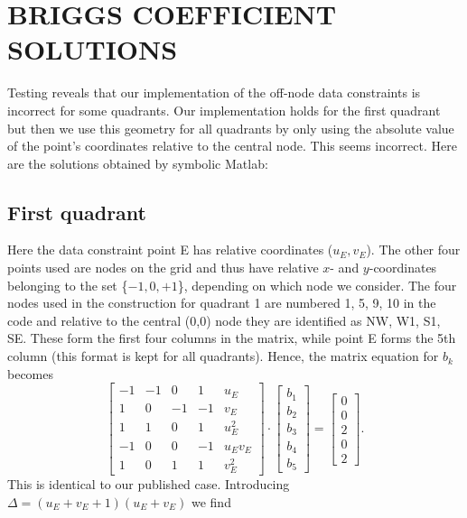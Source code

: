 \documentclass[12pt,letterpaper,margin=0.5in]{report}
\begin{document}
\section*{BRIGGS COEFFICIENT SOLUTIONS}

Testing reveals that our implementation of the off-node data constraints is incorrect
for some quadrants.  Our implementation holds for the first quadrant but then we
use this geometry for all quadrants by only using the absolute value of the point's
coordinates relative to the central node.  This seems incorrect.  Here are the
solutions obtained by symbolic Matlab:
\subsection*{First quadrant}
Here the data constraint point E has relative coordinates ($u_E, v_E$).  The other four points used are
nodes on the grid and thus have relative $x$- and $y$-coordinates belonging to the set \{$-1, 0, +1$\}, depending on
which node we consider. The four nodes used in the
construction for quadrant 1 are numbered 1, 5, 9, 10 in the code and relative to the central (0,0) node they
are identified as NW, W1, S1, SE. These form the first four columns in the matrix, while point E
forms the 5th column (this format is kept for all quadrants).  Hence, the matrix equation
for $b_k$ becomes
\begin{equation}
\left[ {\begin{array}{*{20}{r}}
{ - 1}&{ - 1}&0&1&{{u_E}}\\
1&0&{ - 1}&{ - 1}&{{v_E}}\\
1&1&0&1&{u_E^2}\\
{ - 1}&0&0&{ - 1}&{{u_E}{v_E}}\\
1&0&1&1&{v_E^2}
\end{array}} \right] \cdot \left[ {\begin{array}{*{20}{c}}
{{b_1}}\\
{{b_2}}\\
{{b_3}}\\
{{b_4}}\\
{{b_5}}
\end{array}} \right] = \left[ {\begin{array}{*{20}{c}}
0\\
0\\
2\\
0\\
2
\end{array}} \right].
\end{equation}
This is identical to our published case.  Introducing $\Delta = \left (u_E + v_E + 1 \right)\left (u_E + v_E\right)$ we find
\end{document}
